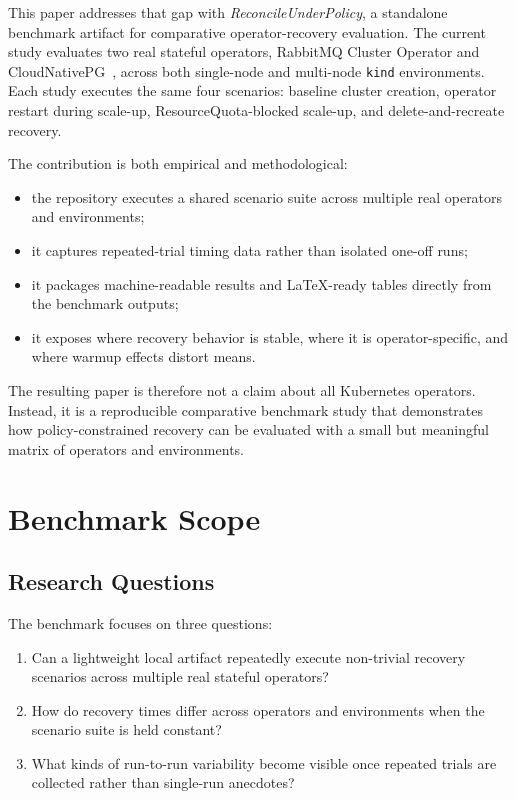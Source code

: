 \documentclass[sigconf,screen]{acmart}
\begin{document}
This paper addresses that gap with \emph{ReconcileUnderPolicy}, a standalone
benchmark artifact for comparative operator-recovery evaluation. The current
study evaluates two real stateful operators, RabbitMQ Cluster Operator and
CloudNativePG~\cite{rabbitmq-quickstart,cloudnativepg-docs}, across both
single-node and multi-node \texttt{kind} environments. Each study executes the
same four scenarios: baseline cluster creation, operator restart during
scale-up, ResourceQuota-blocked scale-up, and delete-and-recreate recovery.

The contribution is both empirical and methodological:

\begin{itemize}
  \item the repository executes a shared scenario suite across multiple real
  operators and environments;
  \item it captures repeated-trial timing data rather than isolated one-off
  runs;
  \item it packages machine-readable results and LaTeX-ready tables directly
  from the benchmark outputs;
  \item it exposes where recovery behavior is stable, where it is
  operator-specific, and where warmup effects distort means.
\end{itemize}

The resulting paper is therefore not a claim about all Kubernetes operators.
Instead, it is a reproducible comparative benchmark study that demonstrates how
policy-constrained recovery can be evaluated with a small but meaningful matrix
of operators and environments.

\section{Benchmark Scope}

\subsection{Research Questions}

The benchmark focuses on three questions:

\begin{enumerate}
  \item Can a lightweight local artifact repeatedly execute non-trivial
  recovery scenarios across multiple real stateful operators?
  \item How do recovery times differ across operators and environments when the
  scenario suite is held constant?
  \item What kinds of run-to-run variability become visible once repeated
  trials are collected rather than single-run anecdotes?
\end{enumerate}
\end{document}
